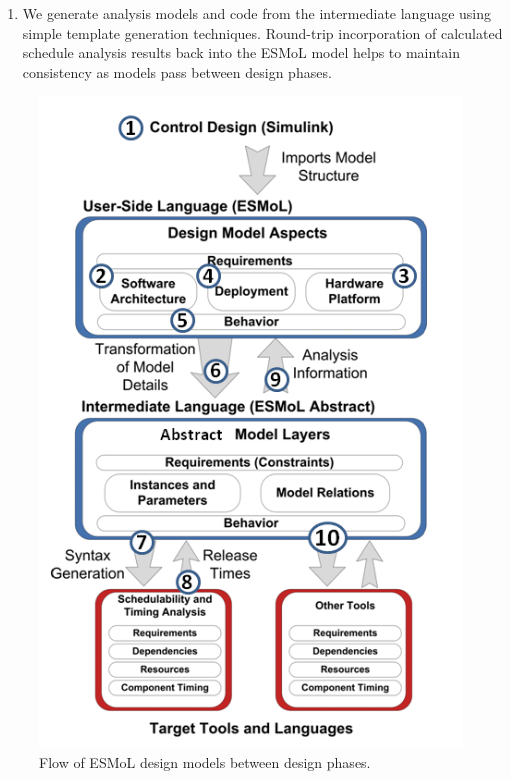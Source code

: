 \begin{enumerate}
\item We generate analysis models and code from the intermediate language
using simple template generation techniques\cite{sched:analysis}.
Round-trip incorporation of calculated schedule 
analysis results back into the ESMoL model helps to
maintain consistency as models pass between design phases.

\end{enumerate}

\begin{figure}
\centering
\includegraphics[width=0.7\columnwidth]{figures/designflow.png}
    \caption{Flow of ESMoL design models between design phases. }
    \label{fig:designflow}
\end{figure}

